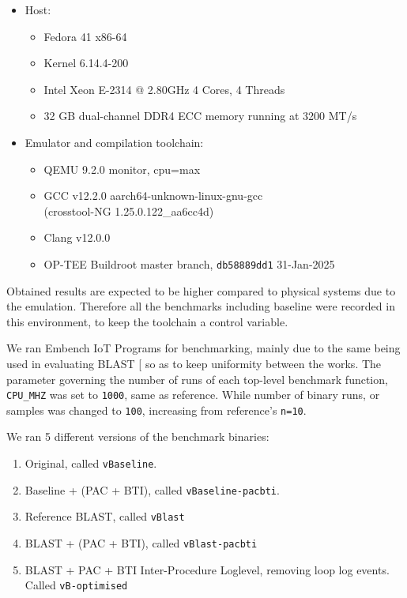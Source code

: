 \documentclass[a4paper, nobind]{templates/ociamthesis}
\providecommand{\tightlist}{%
  \setlength{\itemsep}{0pt}\setlength{\parskip}{0pt}}
\begin{document}
\begin{itemize}
\tightlist
\item
  Host:

  \begin{itemize}
  \tightlist
  \item
    Fedora 41 x86-64
  \item
    Kernel 6.14.4-200
  \item
    Intel Xeon E-2314 @ 2.80GHz 4 Cores, 4 Threads
  \item
    32 GB dual-channel DDR4 ECC memory running at 3200 MT/s
  \end{itemize}
\item
  Emulator and compilation toolchain:

  \begin{itemize}
  \tightlist
  \item
    QEMU 9.2.0 monitor, cpu=max
  \item
    GCC v12.2.0 aarch64-unknown-linux-gnu-gcc\\
    (crosstool-NG 1.25.0.122\_aa6cc4d)
  \item
    Clang v12.0.0
  \item
    OP-TEE Buildroot master branch, \texttt{db58889dd1} 31-Jan-2025
  \end{itemize}
\end{itemize}

Obtained results are expected to be higher compared to physical systems due to
the emulation. Therefore all the benchmarks including baseline were recorded in
this environment, to keep the toolchain a control variable.

We ran Embench IoT Programs for benchmarking, mainly due to the same being used in
evaluating BLAST {[}\citeproc{ref-blast}{56}{]} so as to keep uniformity between the works.
The parameter governing the number of runs of each top-level benchmark function,
\texttt{CPU\_MHZ} was set to \texttt{1000}, same as reference. While number of binary runs, or samples
was changed to \texttt{100}, increasing from reference's \texttt{n=10}.

We ran 5 different versions of the benchmark binaries:

\begin{enumerate}
\def\labelenumi{\arabic{enumi}.}
\tightlist
\item
  Original, called \texttt{vBaseline}.
\item
  Baseline + (PAC + BTI), called \texttt{vBaseline-pacbti}.
\item
  Reference BLAST, called \texttt{vBlast}
\item
  BLAST + (PAC + BTI), called \texttt{vBlast-pacbti}
\item
  BLAST + PAC + BTI Inter-Procedure Loglevel, removing loop log events. Called \texttt{vB-optimised}
\end{enumerate}
\end{document}
